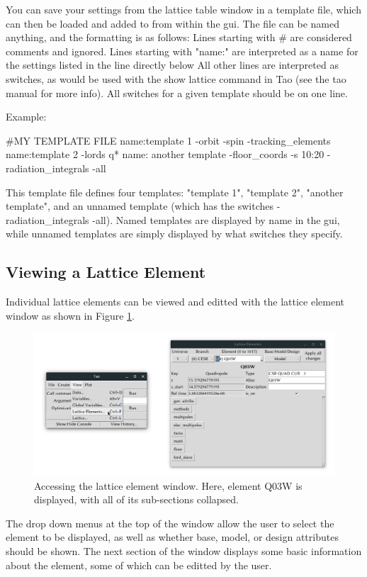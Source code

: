 You can save your settings from the lattice table window in a template file, which can then be loaded and added to from within the gui.
The file can be named anything, and the formatting is as follows:
Lines starting with \# are considered comments and ignored.
Lines starting with "name:" are interpreted as a name for the settings listed in the line directly below
All other lines are interpreted as switches, as would be used with the show lattice command in Tao (see the tao manual for more info).
All switches for a given template should be on one line.

Example:
\begin{example}
#MY TEMPLATE FILE
name:template 1
-orbit -spin -tracking_elements
name:template 2
-lords q*
name: another template
-floor_coords -s 10:20
-radiation_integrals -all
\end{example}

This template file defines four templates: "template 1", "template 2", "another template", and an unnamed template (which has the switches -radiation_integrals -all).  Named templates are displayed by name in the gui, while unnamed templates are simply displayed by what switches they specify.

\subsection{Viewing a Lattice Element}
\label{s:gui.lat.elements}

Individual lattice elements can be viewed and editted with the lattice element window as shown in Figure \ref{fig:gui.lat.element.1}.
\begin{figure}
\centering
\includegraphics[width=12cm]{figures/lat_element_1.png}
\caption{Accessing the lattice element window.
Here, element Q03W is displayed, with all of its sub-sections collapsed.}
\label{fig:gui.lat.element.1}
\end{figure}
The drop down menus at the top of the window allow the user to select the element to be displayed, as well as whether base, model, or design attributes should be shown.
The next section of the window displays some basic information about the element, some of which can be editted by the user.

